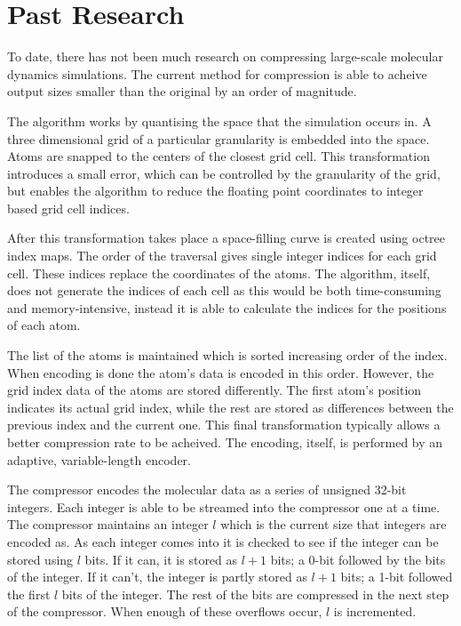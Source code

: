 \documentclass[twocolumn, a4paper,10pt]{article}
\begin{document}
\section*{Past Research}

To date, there has not been much research on compressing large-scale molecular dynamics simulations. The current method \cite{RefWorks:3} for compression is able to acheive output sizes smaller than the original by an order of magnitude. 

The algorithm works by quantising the space that the simulation occurs in. A three dimensional grid of a particular granularity is embedded into the space. Atoms are snapped to the centers of the closest grid cell. This transformation introduces a small error, which can be controlled by the granularity of the grid, but enables the algorithm to reduce the floating point coordinates to integer based grid cell indices.

After this transformation takes place a space-filling curve is created using octree index maps. The order of the traversal gives single integer indices for each grid cell. These indices replace the coordinates of the atoms. The algorithm, itself, does not generate the indices of each cell as this would be both time-consuming and memory-intensive, instead it is able to calculate the indices for the positions of each atom. 

The list of the atoms is maintained which is sorted increasing order of the index. When encoding is done the atom's data is encoded in this order. However, the grid index data of the atoms are stored differently. The first atom's position indicates its actual grid index, while the rest are stored as differences between the previous index and the current one. This final transformation typically allows a better compression rate to be acheived. The encoding, itself, is performed by an adaptive, variable-length encoder.

The compressor encodes the molecular data as a series of unsigned 32-bit integers. Each integer is able to be streamed into the compressor one at a time. The compressor maintains an integer $l$ which is the current size that integers are encoded as. As each integer comes into it is checked to see if the integer can be stored using $l$ bits. If it can, it is stored as $l+1$ bits; a 0-bit followed by the bits of the integer. If it can't, the integer is partly stored as $l+1$ bits; a 1-bit followed the first $l$ bits of the integer. The rest of the bits are compressed in the next step of the compressor. When enough of these overflows occur, $l$ is incremented.
\end{document}
